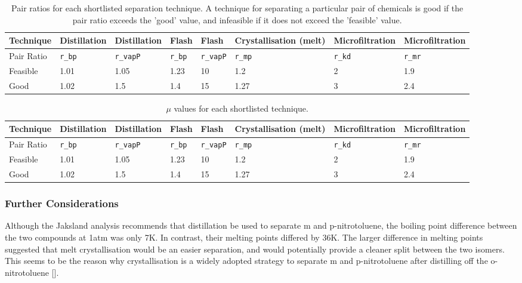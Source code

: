 \begin{landscape}
\begin{table}[H]
\centering
\caption{Pair ratios for each shortlisted separation technique. A technique for separating a particular pair of chemicals is good if the pair ratio exceeds the 'good' value, and infeasible if it does not exceed the 'feasible' value.}
\label{tab:separation-pair-ratio}
\begin{tabular}{llllllll}
\toprule
Technique  & Distillation & Distillation & Flash & Flash   & Crystallisation (melt) & Microfiltration & Microfiltration \\ \midrule
Pair Ratio & \texttt{r\_bp}        & \texttt{r\_vapP}      & \texttt{r\_bp} & \texttt{r\_vapP} & \texttt{r\_mp}                  & \texttt{r\_kd}           & \texttt{r\_mr}           \\
Feasible   & 1.01         & 1.05         & 1.23  & 10      & 1.2                    & 2               & 1.9             \\
Good       & 1.02         & 1.5          & 1.4   & 15      & 1.27                   & 3               & 2.4             \\ \bottomrule
\end{tabular}
\end{table}


\begin{table}[h]
\centering
\caption{$\mu$ values for each shortlisted technique.}
\label{tab:separation-mu}
\begin{tabular}{llllllll}
\toprule
Technique  & Distillation   & Distillation     & Flash          & Flash            & Crystallisation (melt) & Microfiltration & Microfiltration \\ \midrule
Pair Ratio & \texttt{r\_bp} & \texttt{r\_vapP} & \texttt{r\_bp} & \texttt{r\_vapP} & \texttt{r\_mp}         & \texttt{r\_kd}  & \texttt{r\_mr}  \\
Feasible   & 1.01           & 1.05             & 1.23           & 10               & 1.2                    & 2               & 1.9             \\
Good       & 1.02           & 1.5              & 1.4            & 15               & 1.27                   & 3               & 2.4             \\ \bottomrule
\end{tabular}
\end{table}

\subsubsection{Further Considerations}
Although the Jaksland analysis recommends that distillation be used to separate m and p-nitrotoluene, the boiling point difference between the two compounds at 1atm was only 7K. In contrast, their melting points differed by 36K. The larger difference in melting points suggested that melt crystallisation would be an easier separation, and would potentially provide a cleaner split between the two isomers. This seems to be the reason why crystallisation is a widely adopted strategy to separate m and p-nitrotoluene after distilling off the o-nitrotoluene []. 

\end{landscape}
